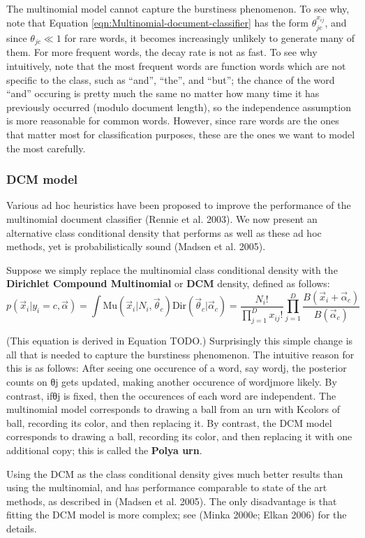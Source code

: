 The multinomial model cannot capture the burstiness phenomenon. To see why, note that Equation \eqref{eqn:Multinomial-document-classifier} has the form $\theta_{jc}^{x_{ij}}$, and since $\theta_{jc} \ll 1$ for rare words, it becomes increasingly unlikely to generate many of them. For more frequent words, the decay rate is not as fast. To see why intuitively, note that the most frequent words are function words which are not specific to the class, such as “and”, “the”, and “but”; the chance of the word “and” occuring is pretty much the same no matter how many time it has previously occurred (modulo document length), so the independence assumption is more reasonable for common words. However, since rare words are the ones that matter most for classification purposes, these are the ones we want to model the most carefully.

\subsubsection{DCM model}
Various ad hoc heuristics have been proposed to improve the performance of the multinomial document classifier (Rennie et al. 2003). We now present an alternative class conditional density that performs as well as these ad hoc methods, yet is probabilistically sound (Madsen et al. 2005).

Suppose we simply replace the multinomial class conditional density with the \textbf{Dirichlet Compound Multinomial} or \textbf{DCM} density, defined as follows:
\begin{equation}
p(\vec{x}_i|y_i=c,\vec{\alpha})=\int \text{Mu}(\vec{x}_i|N_i,\vec{\theta}_c)\text{Dir}(\vec{\theta}_c|\vec{\alpha}_c)=\dfrac{N_i!}{\prod_{j=1}^D x_{ij}!}\prod\limits_{j=1}^D\dfrac{B(\vec{x}_i+\vec{\alpha}_c)}{B(\vec{\alpha}_c)}
\end{equation}

(This equation is derived in Equation TODO.) Surprisingly this simple change is all that is needed to capture the burstiness phenomenon. The intuitive reason for this is as follows: After seeing one occurence of a word, say wordj, the posterior counts on θj gets updated, making another occurence of wordjmore likely. By contrast, ifθj is fixed, then the occurences of each word are independent. The multinomial model corresponds to drawing a ball from an urn with Kcolors of ball, recording its color, and then replacing it. By contrast, the DCM model corresponds to drawing a ball, recording its color, and then replacing it with one additional copy; this is called the \textbf{Polya urn}.

Using the DCM as the class conditional density gives much better results than using the multinomial, and has performance comparable to state of the art methods, as described in (Madsen et al. 2005). The only disadvantage is that fitting the DCM model is more complex; see (Minka 2000e; Elkan 2006) for the details.
